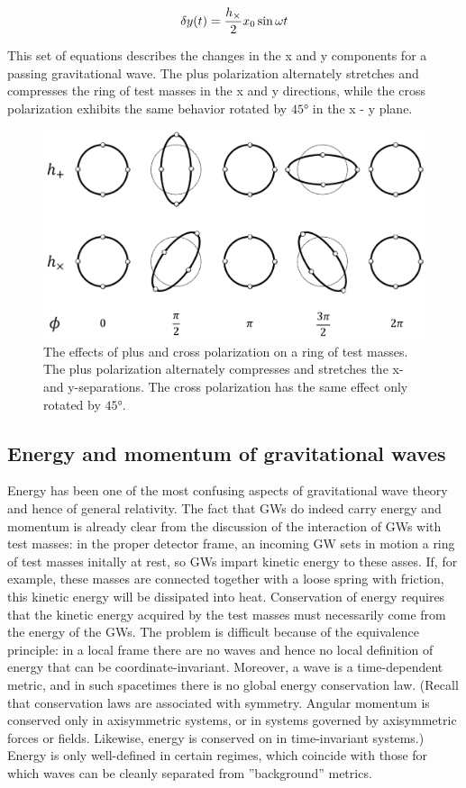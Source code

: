 \documentclass[binding=0.6cm, LaM]{sapthesis}
\begin{document}
		\begin{equation}
		\delta y(t) =  {{h_{\times}} \over 2} x_0  \sin \omega t
		\end{equation}
		
	This set of equations describes the changes in the x and y components for a passing gravitational wave.
	The plus polarization alternately stretches and compresses the ring of test masses in the x and y directions, 
	while the cross polarization exhibits the same behavior rotated by $\ang{45}$ in the x - y plane.

		\begin{figure}
		\includegraphics[scale=1]{ring}
		\centering
		\caption{The effects of plus and cross polarization on a ring of test masses. 
			 The plus polarization alternately compresses and stretches the x- and y-separations.
			 The cross polarization has the same effect only rotated by  $\ang{45}$.}
		\label{fig:ring}
		\end{figure}


\subsection{Energy and momentum of gravitational waves}
	Energy has been one of the most confusing aspects of gravitational wave theory and hence of general relativity.
	The fact that GWs do indeed carry energy and momentum is already clear from the discussion of the interaction of GWs with test masses:
	in the proper detector frame, an incoming GW sets in motion a ring of test masses initally at rest, 
	so GWs impart kinetic energy to these asses.
	If, for example, these masses are connected together with a loose spring with friction, 
	this kinetic energy will be dissipated into heat.
	Conservation of energy requires that the kinetic energy acquired by the test masses must necessarily come from the energy of the GWs.
	The problem is difficult because of the equivalence principle: in a local frame there are no waves and hence no local definition 
	of energy that can be coordinate-invariant.
	Moreover, a wave is a time-dependent metric, and in such spacetimes there is no global energy conservation law. 
	(Recall that conservation laws are associated with symmetry.
	Angular momentum is conserved only in axisymmetric systems, or in systems governed by axisymmetric forces or fields.
	Likewise, energy is conserved on in time-invariant systems.) 
	Energy is only well-defined in certain regimes, which coincide with those for which waves can be cleanly separated from ”background”
 	metrics.
\end{document}
